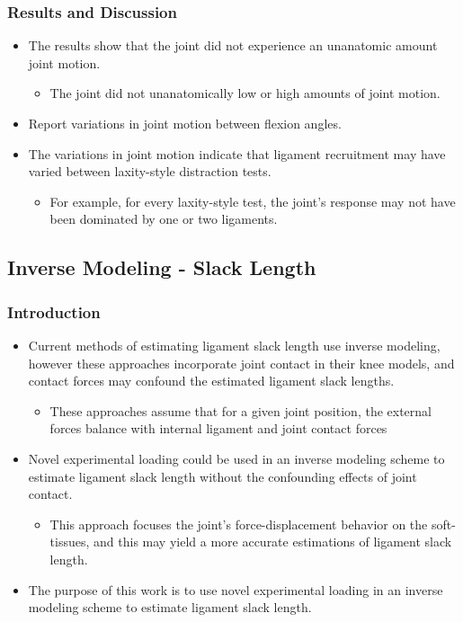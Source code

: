 \documentclass{article}
\begin{document}
\subsubsection{Results and Discussion}
\begin{itemize}
    \item The results show that the joint did not experience an unanatomic amount joint motion.
    \begin{itemize}
        \item The joint did not unanatomically low or high amounts of joint motion.
    \end{itemize}
    \item Report variations in joint motion between flexion angles.
    \item The variations in joint motion indicate that ligament recruitment may have varied between laxity-style distraction tests.
    \begin{itemize}
        \item For example, for every laxity-style test, the joint's response may not have been dominated by one or two ligaments.
    \end{itemize}
\end{itemize}

\subsection{Inverse Modeling - Slack Length}
\subsubsection{Introduction}
\begin{itemize}
    \item Current methods of estimating ligament slack length use inverse modeling, however these approaches incorporate joint contact in their knee models, and contact forces may confound the estimated ligament slack lengths.
    \begin{itemize}
        \item These approaches assume that for a given joint position, the external forces balance with internal ligament and joint contact forces \citep{blankevoort_validation_1996}
    \end{itemize}
    \item Novel experimental loading could be used in an inverse modeling scheme to estimate ligament slack length without the confounding effects of joint contact.
    \begin{itemize}
        \item This approach focuses the joint's force-displacement behavior on the soft-tissues, and this may yield a more accurate estimations of ligament slack length.
    \end{itemize}
    \item The purpose of this work is to use novel experimental loading in an inverse modeling scheme to estimate ligament slack length.
\end{itemize}
\end{document}
